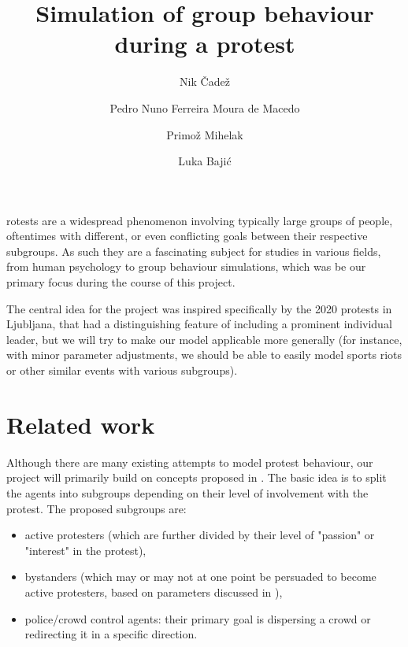 \documentclass[9pt]{pnas-new}
\title{Simulation of group behaviour during a protest}
\author{Nik Čadež}
\author{Pedro Nuno Ferreira Moura de Macedo}
\author{Primož Mihelak}
\author{Luka Bajić}
\affil{Collective behaviour course research seminar report}
\begin{document}
\verticaladjustment{-2pt}

\maketitle
\thispagestyle{firststyle}

rotests are a widespread phenomenon involving typically large groups of people, oftentimes with different, or even conflicting goals between their respective subgroups. As such they are a fascinating subject for studies in various fields, from human psychology to group behaviour simulations, which was be our primary focus during the course of this project. 

\bigskip
The central idea for the project was inspired specifically by the 2020 protests in Ljubljana, that had a distinguishing feature of including a prominent individual leader, but we will try to make our model applicable more generally (for instance, with minor parameter adjustments, we should be able to easily model sports riots or other similar events with various subgroups).  



\section*{Related work}

Although there are many existing attempts to model protest behaviour, our project will primarily build on concepts proposed in \cite{protests}. The basic idea is to split the agents into subgroups depending on their level of involvement with the protest. The proposed subgroups are:
\begin{itemize}
    \item active protesters (which are further divided by their level of "passion" or "interest" in the protest), 
    \item bystanders (which may or may not at one point be persuaded to become active protesters, based on parameters discussed in \cite{sportsriots}),
    \item police/crowd control agents: their primary goal is dispersing a crowd or redirecting it in a specific direction.
\end{itemize}
\end{document}

